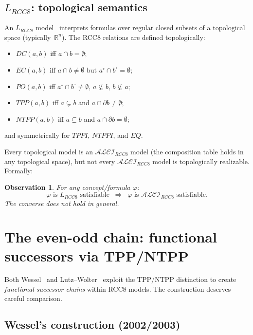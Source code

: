 \documentclass[11pt]{article}
\newtheorem{observation}[theorem]{Observation}
\newcommand{\ALCIRCC}[1]{\ensuremath{\mathcal{ALCI}_{\mathit{RCC#1}}}}
\newcommand{\LRCC}[1]{\ensuremath{L_{\mathit{RCC#1}}}}
\newcommand{\reals}{\mathbb{R}}
\begin{document}
\subsection{$\LRCC{8}$: topological semantics}

An $\LRCC{8}$ model~\cite{LutzWolter2006} interprets formulas over regular
closed subsets of a topological space (typically~$\reals^n$).  The RCC8
relations are defined topologically:
\begin{itemize}
  \item $DC(a,b)$ iff $a \cap b = \emptyset$;
  \item $EC(a,b)$ iff $a \cap b \neq \emptyset$ but $a^\circ \cap b^\circ = \emptyset$;
  \item $PO(a,b)$ iff $a^\circ \cap b^\circ \neq \emptyset$, $a \not\subseteq b$,
    $b \not\subseteq a$;
  \item $TPP(a,b)$ iff $a \subsetneq b$ and $a \cap \partial b \neq \emptyset$;
  \item $NTPP(a,b)$ iff $a \subsetneq b$ and $a \cap \partial b = \emptyset$;
\end{itemize}
and symmetrically for $TPPI$, $NTPPI$, and $EQ$.

Every topological model is an $\ALCIRCC{8}$ model (the composition table holds
in any topological space), but not every $\ALCIRCC{8}$ model is topologically
realizable.  Formally:

\begin{observation}\label{obs:inclusion}
  For any concept/formula $\varphi$:
  \[
  \varphi \text{ is } \LRCC{8}\text{-satisfiable}
  \;\;\Longrightarrow\;\;
  \varphi \text{ is } \ALCIRCC{8}\text{-satisfiable}.
  \]
  The converse does not hold in general.
\end{observation}

\section{The even-odd chain: functional successors via TPP/NTPP}
\label{sec:chain}

Both Wessel~\cite{Wessel2003} and Lutz--Wolter~\cite{LutzWolter2006} exploit
the TPP/NTPP distinction to create \emph{functional successor chains} within
RCC8 models.  The construction deserves careful comparison.

\subsection{Wessel's construction (2002/2003)}
\end{document}
